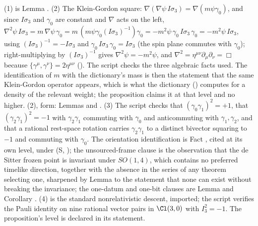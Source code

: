 (1) is Lemma . (2) The Klein-Gordon square: $\nabla(\nabla\psi\,I\sigma_{3}) = \nabla(m\psi\gamma_{0})$, and since $I\sigma_{3}$ and $\gamma_{0}$ are constant and $\nabla$ acts on the left, $\nabla^{2}\psi\, I\sigma_{3} = m\,\nabla\psi\,\gamma_{0} = m\,(m\psi\gamma_{0}(I\sigma_{3})^{-1})\gamma_{0} = -m^{2}\psi\,\gamma_{0}\,I\sigma_{3}\,\gamma_{0} = -m^{2}\psi\, I\sigma_{3}$, using $(I\sigma_{3})^{-1} = -I\sigma_{3}$ and $\gamma_{0}\,I\sigma_{3}\,\gamma_{0} = I\sigma_{3}$ (the spin plane commutes with $\gamma_{0}$); right-multiplying by $(I\sigma_{3})^{-1}$ gives $\nabla^{2}\psi = -m^{2}\psi$, and $\nabla^{2} = \eta^{\mu\nu}\partial_{\mu}\partial_{\nu} = \Box$ because $\{\gamma^{\mu}, \gamma^{\nu}\} = 2\eta^{\mu\nu}$ (). The script checks the three algebraic facts used. The identification of $m$ with the dictionary's mass is then the statement that the same Klein-Gordon operator appears, which is what the dictionary () computes for a density of the relevant weight; the proposition claims it at that level and no higher. (2), form: Lemmas  and . (3) The script checks that $(\gamma_{0}\gamma_{1})^{2} = +1$, that $(\gamma_{2}\gamma_{1})^{2} = -1$ with $\gamma_{2}\gamma_{1}$ commuting with $\gamma_{0}$ and anticommuting with $\gamma_{1}, \gamma_{2}$, and that a rational rest-space rotation carries $\gamma_{2}\gamma_{1}$ to a distinct bivector squaring to $-1$ and commuting with $\gamma_{0}$. The orientation identification is Fact , cited at its own level, under (S, ); the unsourced-frame clause is the observation that the de Sitter frozen point is invariant under $SO(1,4)$, which contains no preferred timelike direction, together with the absence in the series of any theorem selecting one, sharpened by Lemma  to the statement that none can exist without breaking the invariance; the one-datum and one-bit clauses are Lemma  and Corollary . (4) is the standard nonrelativistic descent, imported; the script verifies the Pauli identity on nine rational vector pairs in $\Cl(3,0)$ with $I_{3}^{2} = -1$. The proposition's level is declared in its statement.
